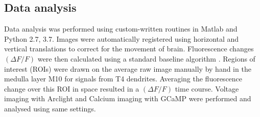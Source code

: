 \documentclass[9pt,lineno]{elife}
\begin{document}
\subsection{Data analysis}
Data analysis was performed using custom-written routines in Matlab and Python 2.7, 3.7. Images were automatically registered using horizontal and vertical translations to correct for the movement of brain. Fluorescence changes $(\Delta F/F)$ were then calculated using a standard baseline algorithm \parencite{Jia2010}. Regions of interest (ROIs) were drawn on the average raw image manually by hand in the medulla layer M10 for signals from T4 dendrites. Averaging the fluorescence change over this ROI in space resulted in a $(\Delta F/F)$ time course. Voltage imaging with Arclight and Calcium imaging with GCaMP were performed and analysed using same settings.

\printbibliography[heading=bibintoc]
\end{document}
